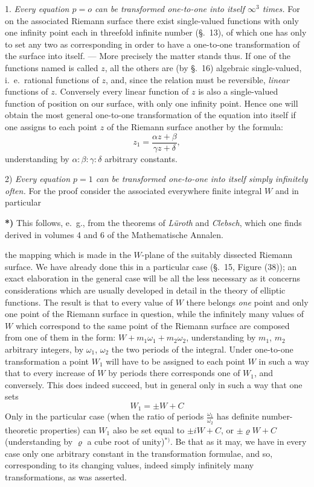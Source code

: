 \documentclass{article}
\begin{document}
1. \emph{Every equation $p = o$ can be transformed one-to-one into itself $\infty^{3}$ times.} For on the associated Riemann surface there exist single-valued functions with only one infinity point each in threefold infinite number (§.~13), of which one has only to set any two as corresponding in order to have a one-to-one transformation of the surface into itself. --- More precisely the matter stands thus. If one of the functions named is called $z$, all the others are (by §.~16) algebraic single-valued, i.\ e.\ rational functions of $z$, and, since the relation must be reversible, \emph{linear} functions of $z$. Conversely every linear function of $z$ is also a single-valued function of position on our surface, with only one infinity point. Hence one will obtain the most general one-to-one transformation of the equation into itself if one assigns to each point $z$ of the Riemann surface another by the formula:
\[ z_{1} = \frac{\alpha z + \beta}{\gamma z + \delta}, \]
understanding by $\alpha : \beta : \gamma : \delta$ arbitrary constants.

2) \emph{Every equation $p = 1$ can be transformed one-to-one into itself simply infinitely often.} For the proof consider the associated everywhere finite integral $W$ and in particular

\textbf{*)} This follows, e.\ g., from the theorems of \emph{Lüroth} and \emph{Clebsch}, which one finds derived in volumes 4 and 6 of the Mathematische Annalen.

the mapping which is made in the $W$-plane of the suitably dissected Riemann surface. We have already done this in a particular case (§.~15, Figure (38)); an exact elaboration in the general case will be all the less necessary as it concerns considerations which are usually developed in detail in the theory of elliptic functions. The result is that to every value of $W$ there belongs \emph{one} point and only one point of the Riemann surface in question, while the infinitely many values of $W$ which correspond to the same point of the Riemann surface are composed from one of them in the form: $W + m_{1}\omega_{1} + m_{2}\omega_{2}$, understanding by $m_{1}$, $m_{2}$ arbitrary integers, by $\omega_{1}$, $\omega_{2}$ the two periods of the integral. Under one-to-one transformation a point $W_{1}$ will have to be assigned to each point $W$ in such a way that to every increase of $W$ by periods there corresponds one of $W_{1}$, and conversely. This does indeed succeed, but in general only in such a way that one sets
\[ W_{1} = \pm W + C \]
Only in the particular case (when the ratio of periods $\frac{\omega_{1}}{\omega_{2}}$ has definite number-theoretic properties) can $W_{1}$ also be set equal to $\pm iW + C$, or $\pm \varrho W + C$ (understanding by $\varrho$ a cube root of unity)${}^{*)}$. Be that as it may, we have in every case only one arbitrary constant in the transformation formulae, and so, corresponding to its changing values, indeed simply infinitely many transformations, as was asserted.
\end{document}
